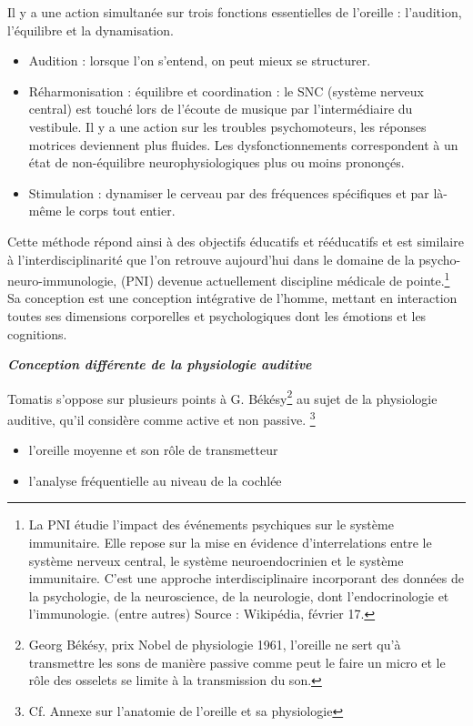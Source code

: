Il y a une action simultanée sur trois fonctions essentielles de l'oreille
: l'audition, l'équilibre et la dynamisation.
\begin{itemize}
	\item Audition : lorsque l'on s'entend, on peut mieux se structurer.
	\item Réharmonisation : équilibre et coordination : le SNC (système 
nerveux
		central) est touché lors de l'écoute de musique par 
l'intermédiaire
		du vestibule. Il y a une action sur les troubles psychomoteurs, 
les
		réponses motrices deviennent plus fluides. Les 
dysfonctionnements
		correspondent à un état de non-équilibre neurophysiologiques 
plus
		ou moins prononçés. 
	\item Stimulation : dynamiser le cerveau par des fréquences spécifiques
          et par là-même le corps tout entier.

 
\end{itemize}



Cette méthode répond ainsi à des objectifs éducatifs et rééducatifs et
est similaire à l'interdisciplinarité  que l'on retrouve
aujourd'hui dans le domaine de la 
psycho-neuro-immunologie,
(PNI) devenue actuellement discipline médicale de pointe.\footnote{La PNI étudie 
l'impact des événements psychiques sur le système immunitaire. Elle repose sur 
la mise en évidence d'interrelations entre le système
nerveux central, le système neuroendocrinien et le système immunitaire.
C'est une approche interdisciplinaire incorporant des données de la
psychologie, de la neuroscience, de la neurologie, dont l'endocrinologie
et l'immunologie. (entre autres) Source : Wikipédia, février 17.}
Sa conception est une conception intégrative
de l'homme, mettant en interaction toutes ses dimensions corporelles
et psychologiques dont 
les émotions et les cognitions.






\emph{\textbf{Conception différente de la physiologie auditive}}

Tomatis  s'oppose sur plusieurs points à G. Békésy\footnote{Georg Békésy, prix 
Nobel de physiologie 1961, l'oreille ne sert qu'à transmettre les sons de manière passive
comme peut le faire un micro et le rôle des osselets 
se limite à la transmission du
son. }  au sujet de la
physiologie auditive, qu'il considère comme active et non passive. \footnote{Cf. Annexe sur l'anatomie de l'oreille et sa physiologie}


\begin{itemize}
	\item l'oreille moyenne et son rôle de transmetteur 
	\item l'analyse fréquentielle au niveau de la cochlée
\end{itemize}

